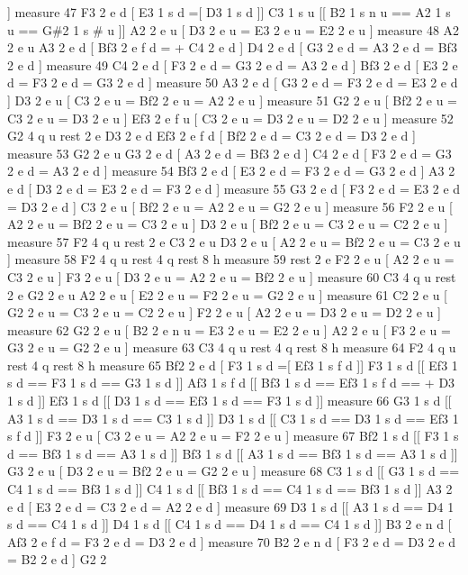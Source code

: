 \mbox{]} measure 47 F3 2 e d \mbox{[} E3 1 s d =\mbox{[} D3 1 s d \mbox{]}\mbox{]} C3 1 s u \mbox{[}\mbox{[} B2 1 s n u == A2 1 s u == G\#2 1 s \# u \mbox{]}\mbox{]} A2 2 e u \mbox{[} D3 2 e u = E3 2 e u = E2 2 e u \mbox{]} measure 48 A2 2 e u A3 2 e d \mbox{[} Bf3 2 e f d = + C4 2 e d \mbox{]} D4 2 e d \mbox{[} G3 2 e d = A3 2 e d = Bf3 2 e d \mbox{]} measure 49 C4 2 e d \mbox{[} F3 2 e d = G3 2 e d = A3 2 e d \mbox{]} Bf3 2 e d \mbox{[} E3 2 e d = F3 2 e d = G3 2 e d \mbox{]} measure 50 A3 2 e d \mbox{[} G3 2 e d = F3 2 e d = E3 2 e d \mbox{]} D3 2 e u \mbox{[} C3 2 e u = Bf2 2 e u = A2 2 e u \mbox{]} measure 51 G2 2 e u \mbox{[} Bf2 2 e u = C3 2 e u = D3 2 e u \mbox{]} Ef3 2 e f u \mbox{[} C3 2 e u = D3 2 e u = D2 2 e u \mbox{]} measure 52 G2 4 q u rest 2 e D3 2 e d Ef3 2 e f d \mbox{[} Bf2 2 e d = C3 2 e d = D3 2 e d \mbox{]} measure 53 G2 2 e u G3 2 e d \mbox{[} A3 2 e d = Bf3 2 e d \mbox{]} C4 2 e d \mbox{[} F3 2 e d = G3 2 e d = A3 2 e d \mbox{]} measure 54 Bf3 2 e d \mbox{[} E3 2 e d = F3 2 e d = G3 2 e d \mbox{]} A3 2 e d \mbox{[} D3 2 e d = E3 2 e d = F3 2 e d \mbox{]} measure 55 G3 2 e d \mbox{[} F3 2 e d = E3 2 e d = D3 2 e d \mbox{]} C3 2 e u \mbox{[} Bf2 2 e u = A2 2 e u = G2 2 e u \mbox{]} measure 56 F2 2 e u \mbox{[} A2 2 e u = Bf2 2 e u = C3 2 e u \mbox{]} D3 2 e u \mbox{[} Bf2 2 e u = C3 2 e u = C2 2 e u \mbox{]} measure 57 F2 4 q u rest 2 e C3 2 e u D3 2 e u \mbox{[} A2 2 e u = Bf2 2 e u = C3 2 e u \mbox{]} measure 58 F2 4 q u rest 4 q rest 8 h measure 59 rest 2 e F2 2 e u \mbox{[} A2 2 e u = C3 2 e u \mbox{]} F3 2 e u \mbox{[} D3 2 e u = A2 2 e u = Bf2 2 e u \mbox{]} measure 60 C3 4 q u rest 2 e G2 2 e u A2 2 e u \mbox{[} E2 2 e u = F2 2 e u = G2 2 e u \mbox{]} measure 61 C2 2 e u \mbox{[} G2 2 e u = C3 2 e u = C2 2 e u \mbox{]} F2 2 e u \mbox{[} A2 2 e u = D3 2 e u = D2 2 e u \mbox{]} measure 62 G2 2 e u \mbox{[} B2 2 e n u = E3 2 e u = E2 2 e u \mbox{]} A2 2 e u \mbox{[} F3 2 e u = G3 2 e u = G2 2 e u \mbox{]} measure 63 C3 4 q u rest 4 q rest 8 h measure 64 F2 4 q u rest 4 q rest 8 h measure 65 Bf2 2 e d \mbox{[} F3 1 s d =\mbox{[} Ef3 1 s f d \mbox{]}\mbox{]} F3 1 s d \mbox{[}\mbox{[} Ef3 1 s d == F3 1 s d == G3 1 s d \mbox{]}\mbox{]} Af3 1 s f d \mbox{[}\mbox{[} Bf3 1 s d == Ef3 1 s f d == + D3 1 s d \mbox{]}\mbox{]} Ef3 1 s d \mbox{[}\mbox{[} D3 1 s d == Ef3 1 s d == F3 1 s d \mbox{]}\mbox{]} measure 66 G3 1 s d \mbox{[}\mbox{[} A3 1 s d == D3 1 s d == C3 1 s d \mbox{]}\mbox{]} D3 1 s d \mbox{[}\mbox{[} C3 1 s d == D3 1 s d == Ef3 1 s f d \mbox{]}\mbox{]} F3 2 e u \mbox{[} C3 2 e u = A2 2 e u = F2 2 e u \mbox{]} measure 67 Bf2 1 s d \mbox{[}\mbox{[} F3 1 s d == Bf3 1 s d == A3 1 s d \mbox{]}\mbox{]} Bf3 1 s d \mbox{[}\mbox{[} A3 1 s d == Bf3 1 s d == A3 1 s d \mbox{]}\mbox{]} G3 2 e u \mbox{[} D3 2 e u = Bf2 2 e u = G2 2 e u \mbox{]} measure 68 C3 1 s d \mbox{[}\mbox{[} G3 1 s d == C4 1 s d == Bf3 1 s d \mbox{]}\mbox{]} C4 1 s d \mbox{[}\mbox{[} Bf3 1 s d == C4 1 s d == Bf3 1 s d \mbox{]}\mbox{]} A3 2 e d \mbox{[} E3 2 e d = C3 2 e d = A2 2 e d \mbox{]} measure 69 D3 1 s d \mbox{[}\mbox{[} A3 1 s d == D4 1 s d == C4 1 s d \mbox{]}\mbox{]} D4 1 s d \mbox{[}\mbox{[} C4 1 s d == D4 1 s d == C4 1 s d \mbox{]}\mbox{]} B3 2 e n d \mbox{[} Af3 2 e f d = F3 2 e d = D3 2 e d \mbox{]} measure 70 B2 2 e n d \mbox{[} F3 2 e d = D3 2 e d = B2 2 e d \mbox{]} G2 2 